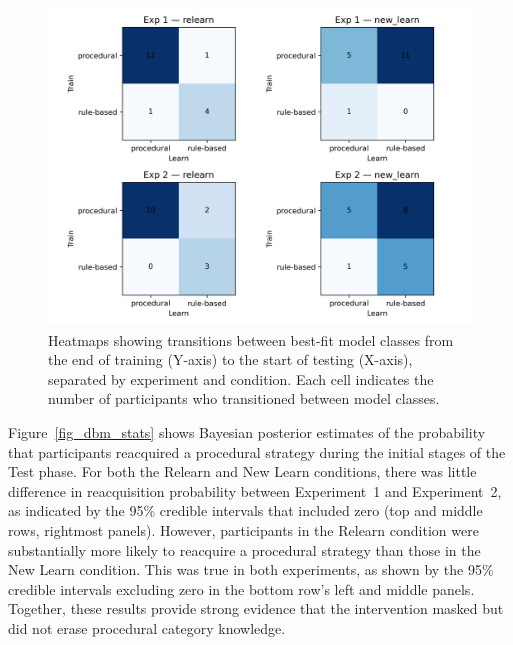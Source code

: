 \documentclass{article}
\begin{document}
\begin{figure}[H]
    \centering
    \includegraphics[width=\textwidth]{../figures/best_model_class_heatmap.png}
    \caption{
        Heatmaps showing transitions between best-fit model
        classes from the end of training (Y-axis) to the
        start of testing (X-axis), separated by experiment
        and condition. Each cell indicates the number of
        participants who transitioned between model classes.
}
\label{fig_dbm_maps}
\end{figure}

Figure~\ref{fig_dbm_stats} shows Bayesian posterior
estimates of the probability that participants reacquired a
procedural strategy during the initial stages of the Test
phase. For both the Relearn and New Learn conditions, there
was little difference in reacquisition probability between
Experiment~1 and Experiment~2, as indicated by the 95\%
credible intervals that included zero (top and middle rows,
rightmost panels). However, participants in the Relearn
condition were substantially more likely to reacquire a
procedural strategy than those in the New Learn condition.
This was true in both experiments, as shown by the 95\%
credible intervals excluding zero in the bottom row's left
and middle panels. Together, these results provide strong
evidence that the intervention masked but did not erase
procedural category knowledge.
\end{document}
